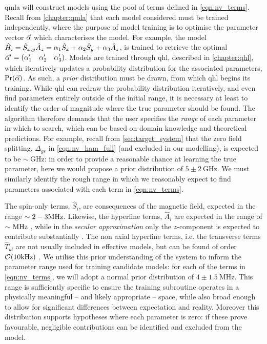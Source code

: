 \gls{qmla} will construct models using the pool of terms defined in \cref{eqn:nv_terms}. 
Recall from \cref{chapter:qmla} that each model considered must be trained independently, 
    where the purpose of model training is to optimise the parameter vector $\vec{\alpha}$ which characterises the model. 
For example, the model 
    $\hat{H}_i = \hat{S}_{x,y} \hat{A}_{z} = \alpha_1 \hat{S}_x  + \alpha_2 \hat{S}_y + \alpha_3 \hat{A}_z$,
    is trained to retrieve the optimal $\vec{\alpha}^{\prime} = \begin{matrix}(\alpha_1^{\prime} & \alpha_2^{\prime} & \alpha_3^{\prime})\end{matrix}$. 
Models are trained through \gls{qhl}, described in \cref{chapter:qhl}, 
    which iteratively updates a probability distribution for the associated parameters, $\Pr(\vec{\alpha})$. 
As such, a \emph{prior} distribution must be drawn, from which \gls{qhl} begins its training. 
While \gls{qhl} can redraw the probability distribution iteratively, and even find parameters entirely outside of the initial range, 
    it is necessary at least to identify the order of magnitude where the true parameter should be found. 
The algorithm therefore demands that the user specifies the \emph{range} of each parameter in which to search, 
    which can be based on domain knowledge and theoretical predictions. 
For example, recall from \cref{sec:target_system} that the zero field splitting, $\Delta_{gs}$ in \cref{eqn:nv_ham_full} (and excluded in our modelling),
    is expected to be $\sim \SI{}{\giga\hertz}$: in order to provide a reasonable chance at learning the true parameter,
    here we would propose a prior distribution of $5 \pm 2 \SI{}{\giga\hertz}$.
We must similarly identify the rough range in which we reasonably expect to find parameters associated with each term in \cref{eqn:nv_terms}.
\par

The spin-only terms, $\hat{S}_i$, are consequences of the magnetic field, 
    expected in the range $\sim 2-3 \textrm{MHz}$.
Likewise, the hyperfine terms, $\hat{A}_i$ are expected in the range of $\sim \textrm{MHz}$ \cite{gali2008ab}, 
    while in the \emph{secular approximation} only the $z$-component is expected to contribute substantially \cite{dutt2007quantum}. 
The non axial hyperfine terms, i.e. the transverse terms $\hat{T}_{kl}$ are not usually included in effective models, 
    but can be found of order $\mathcal{O}(10 \textrm{kHz})$ \cite{hou2019experimental}. 
We utilise this prior understanding of the system to inform the parameter range used for training candidate models:
    for each of the terms in \cref{eqn:nv_terms}, we will adopt a normal prior distribution of $4 \pm 1.5\SI{}{\mega\hertz}$. 
This range is sufficiently specific to ensure the training subroutine operates in a physically meaningful -- 
    and likely appropriate -- space, while also broad enough to allow for significant differences between expectation and reality.
Moreover this distribution supports hypotheses where each parameter is zero:
    if these prove favourable, negligible contributions can be identified and excluded from the model.

